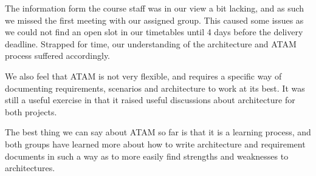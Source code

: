 The information form the course staff was in our view a bit lacking, and as such
we missed the first meeting with our assigned group.  This caused some issues
as we could not find an open slot in our timetables until 4 days before the
delivery deadline.  Strapped for time, our understanding of the architecture
and ATAM process suffered accordingly.

We also feel that ATAM is not very flexible, and requires a specific
way of documenting requirements, scenarios and architecture to work at
its best. It was still a useful exercise in that it raised useful discussions
about architecture for both projects.

The best thing we can say about ATAM so far is that it is a learning process,
and both groups have learned more about how to write architecture and
requirement documents in such a way as to more easily find strengths
and weaknesses to architectures.

